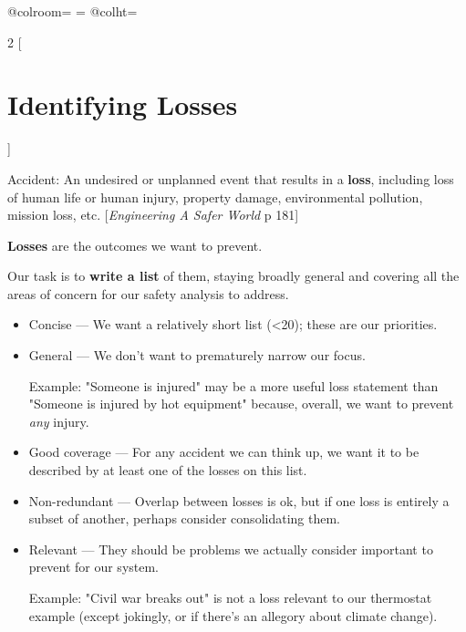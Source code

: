 \documentclass[a4paper]{tufte-book}
\begin{document}
\begin{landscape}
\advance{}
\csname @colroom\endcsname=\vsize
\textheight=\vsize
\csname @colht\endcsname=\vsize

\setlength{\parindent}{0em}
\setlength{\parskip}{.75em}


\begin{multicols}{2}
[ \section{Identifying Losses}]


Accident: An undesired or unplanned event that results in a \textbf{loss}, including loss of human life or human injury, property damage, environmental pollution, mission loss, etc. [\emph{Engineering A Safer World} p 181]

\textbf{Losses} are the outcomes we want to prevent.

Our task is to \textbf{write a list} of them, staying broadly general and covering all the areas of concern for our safety analysis to address.


 \columnbreak

\begin{itemize}
\setlength{\itemsep}{0pt}
\setlength{\parskip}{.25em}
\item Concise --- We want a relatively short list (<20); these are our priorities.
\item General --- We don't want to prematurely narrow our focus. 

Example: "Someone is injured" may be a more useful loss statement than "Someone is injured by hot equipment" because, overall, we want to prevent \emph{any} injury.
\item Good coverage --- For any accident we can think up, we want it to be described by at least one of the losses on this list.
\item Non-redundant --- Overlap between losses is ok, but if one loss is entirely a subset of another, perhaps consider consolidating them.
\item Relevant --- They should be problems we actually consider important to prevent for our system. 

Example: "Civil war breaks out" is not a loss relevant to our thermostat example (except jokingly, or if there's an allegory about climate change).
\end{itemize}  
 

\end{multicols}
\end{landscape}
\end{document}
